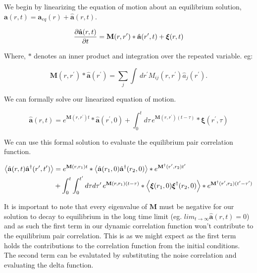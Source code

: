 We begin by linearizing the equation of motion about an equilibrium solution, $\mathbf{a}(r, t) = \mathbf{a}_{eq}(r) + \hat{\mathbf{a}}(r, t)$.

\begin{equation}
	\frac{\partial \hat{\mathbf{a}} (r, t)}{\partial t} = \mathbf{M}(r, r^\prime) \ast \hat{\mathbf{a}}(r^\prime, t) + \boldsymbol{\xi}(r, t)
\end{equation}

Where, $\ast$ denotes an inner product and integration over the repeated variable. eg:

\begin{equation}
	\mathbf{M}(r, r^\prime)\ast \hat{\mathbf{a}}(r^\prime) = \sum_j \int\,dr^\prime M_{ij}(r, r^\prime) \hat{a}_j(r^\prime).
\end{equation}

We can formally solve our linearized equation of motion.

\begin{equation}
	\hat{\mathbf{a}}(r, t) = e^{\mathbf{M}(r, r^\prime)t}\ast\hat{\mathbf{a}}(r^\prime, 0) + \int_0^t d\tau\, e^{\mathbf{M}(r, r^\prime)(t-\tau)} \ast \boldsymbol{\xi} (r^\prime, \tau)
\end{equation}

We can use this formal solution to evaluate the equilibrium pair correlation function.

\begin{align}
	\left\langle \hat{\mathbf{a}}(r, t)\hat{\mathbf{a}}^\dagger(r^\prime, t^\prime) \right\rangle &= e^{\mathbf{M}(r, r_1)t}\ast\left\langle \hat{\mathbf{a}}(r_1, 0)\hat{\mathbf{a}}^\dagger(r_2, 0) \right\rangle \ast e^{\mathbf{M}^\dagger(r^\prime, r_2)t^\prime} \nonumber \\
	&+ \int_0^t \int_0^{t^\prime}d\tau d\tau^\prime\, e^{\mathbf{M}(r, r_1)(t-\tau)}\ast\left\langle \boldsymbol{\xi}(r_1, 0)\boldsymbol{\xi}^\dagger(r_2, 0) \right\rangle \ast e^{\mathbf{M}^\dagger(r^\prime, r_2)(t^\prime-\tau^\prime)}
\end{align}

It is important to note that every eigenvalue of $\mathbf{M}$ must be negative for our solution to decay to equilibrium in the long time limit (eg. $lim_{t\rightarrow\infty}\hat{\mathbf{a}}(r, t) = 0$) and as such the first term in our dynamic correlation function won't contribute to the equilibrium pair correlation. This is as we might expect as the first term holds the contributions to the correlation function from the initial conditions. The second term can be evalutated by substituting the noise correlation and evaluating the delta function.

